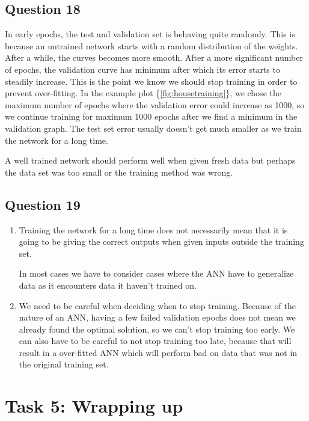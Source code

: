 \documentclass[a4paper]{article}
\begin{document}
\subsection*{Question 18}
In early epochs, the test and validation set is behaving quite randomly. This is because an untrained network starts with a random distribution of the weights. After a while, the curves becomes more smooth. 
After a more significant number of epochs, the validation curve
has minimum after which its error starts to steadily increase. This is the point we know we should stop training in order to prevent over-fitting. 
In the example plot \{\ref{fig:housetraining}\}, we chose the maximum number of epochs where the validation error could increase as 1000, so we continue training for maximum 1000 epochs after we find a minimum in the validation graph. The test set error usually doesn't get much smaller as we train the network for a long time. 

A well trained network should perform well when given fresh data but perhaps the data set was too small or the training method was wrong.

\subsection*{Question 19}
\begin{enumerate}
\item Training the network for a long time does not necessarily mean that it is going to be giving the correct outputs when given inputs outside the training set.

In most cases we have to consider cases where the ANN have to generalize data as it encounters data it haven't trained on.  

\item We need to be careful when deciding when to stop training. Because of the nature of an ANN, having a few failed validation epochs does not mean we already found the optimal solution, so we can't stop training too early. We can also have to be careful to not stop training too late, because that will result in a over-fitted ANN which will perform bad on data that was not in the original training set. 
\end{enumerate}

\section{Task 5: Wrapping up}
\end{document}
